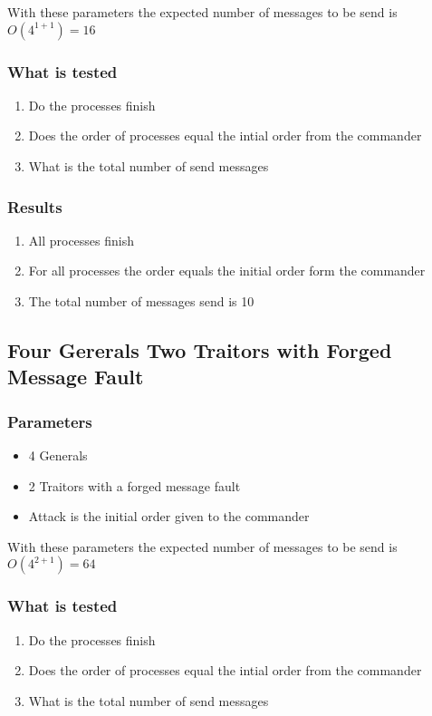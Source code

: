 \documentclass[a4paper, notitlepage]{article}
\begin{document}
With these parameters the expected number of messages to be send is \(O(4^{1+1}) = 16\)

\subsubsection*{What is tested}
\begin{enumerate}
\item Do the processes finish
\item Does the order of processes equal the intial order from the commander
\item What is the total number of send messages
\end{enumerate}

\subsubsection*{Results}
\begin{enumerate}
\item All processes finish
\item For all processes the order equals the initial order form the commander
\item The total number of messages send is 10
\end{enumerate}





\subsection{Four Gererals Two Traitors with Forged Message Fault}

\subsubsection*{Parameters}
\begin{itemize}
\item 4 Generals
\item 2 Traitors with a forged message fault
\item Attack is the initial order given to the commander
\end{itemize}

With these parameters the expected number of messages to be send is \(O(4^{2+1}) = 64\)

\subsubsection*{What is tested}
\begin{enumerate}
\item Do the processes finish
\item Does the order of processes equal the intial order from the commander
\item What is the total number of send messages
\end{enumerate}
\end{document}
